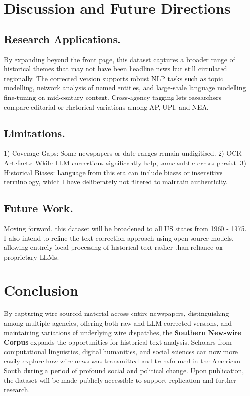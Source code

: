 \documentclass{article}
\begin{document}
\section{Discussion and Future Directions}
\label{sec:discussion}
\subsection{Research Applications.} 
By expanding beyond the front page, this dataset captures a broader range of historical themes that may not have been headline news but still circulated regionally. The corrected version supports robust NLP tasks such as topic modelling, network analysis of named entities, and large-scale language modelling fine-tuning on mid-century content. Cross-agency tagging lets researchers compare editorial or rhetorical variations among AP, UPI, and NEA.

\subsection{Limitations.} 
1) Coverage Gaps: Some newspapers or date ranges remain undigitised. 2) OCR Artefacts: While LLM corrections significantly help, some subtle errors persist. 3) Historical Biases: Language from this era can include biases or insensitive terminology, which I have deliberately not filtered to maintain authenticity.

\subsection{Future Work.} 
Moving forward, this dataset will be broadened to all US states from 1960 - 1975. I also intend to refine the text correction approach using open-source models, allowing entirely local processing of historical text rather than reliance on proprietary LLMs.

\section{Conclusion}
By capturing wire-sourced material across entire newspapers, distinguishing among multiple agencies, offering both raw and LLM-corrected versions, and maintaining variations of underlying wire dispatches, the \textbf{Southern Newswire Corpus} expands the opportunities for historical text analysis. Scholars from computational linguistics, digital humanities, and social sciences can now more easily explore how wire news was transmitted and transformed in the American South during a period of profound social and political change. Upon publication, the dataset will be made publicly accessible to support replication and further research.
\end{document}
